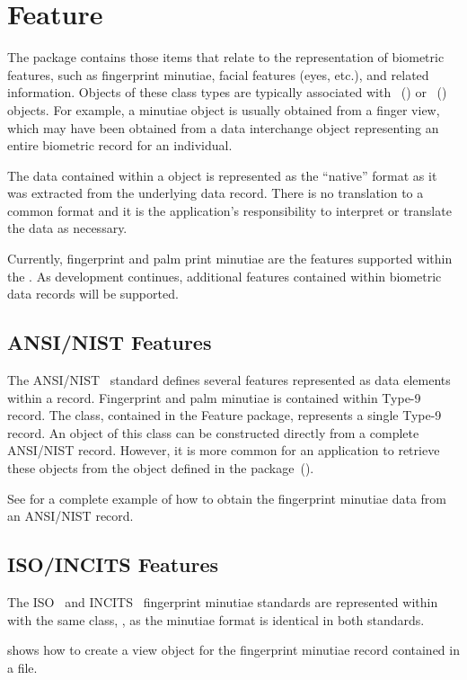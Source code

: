 %
%
\chapter{Feature}
\label{chp-feature}
The  package contains those items that relate to the representation of
biometric features, such as fingerprint minutiae, facial features (eyes, etc.),
and related information. Objects of these class types are typically associated
with ~() or
~()
objects. For example, a minutiae object is usually obtained from a finger view,
which may have been obtained from a data interchange object representing an
entire biometric record for an individual.

The data contained within a  object is represented as the
``native'' format as it was extracted from the underlying data record. There
is no translation to a common format and it is the application's responsibility 
to interpret or translate the data as necessary.

Currently, fingerprint and palm print minutiae are the features supported within
the \sname. As development continues, additional features contained within
biometric data records will be supported.

\section{ANSI/NIST Features}
\label{sec-ansinistfeatures}
The ANSI/NIST~\cite{std:an2k} standard defines several features represented
as data elements within a record. Fingerprint and palm minutiae is contained
within Type-9 record. The  class, contained in the Feature
package, represents a single Type-9 record. An object of this class can be
constructed directly from a complete ANSI/NIST record. However, it is more
common for an application to retrieve these objects from the 
object defined in the  package~().

See  for a complete example of how to obtain
the fingerprint minutiae data from an ANSI/NIST record.

\section{ISO/INCITS Features}

The ISO~\cite{std:iso19794-2} and INCITS~\cite{std:ansi378-2004} fingerprint
minutiae standards are represented within \sname with the same class,
, as the minutiae format is identical in both standards.

 shows how to create a view object for the
fingerprint minutiae record contained in a file.
